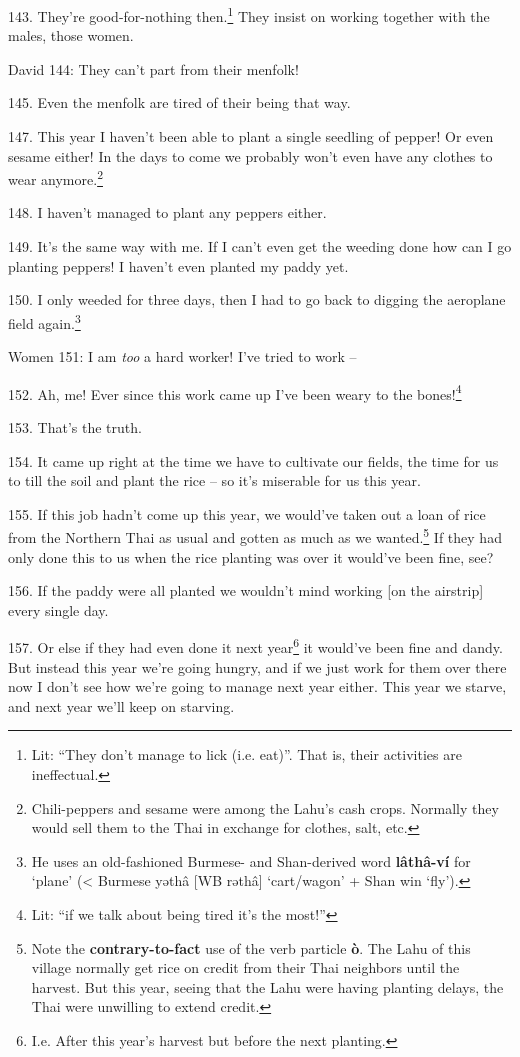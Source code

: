 143. They're good-for-nothing then.\footnote{Lit: ``They don't manage to lick (i.e. eat)''. That is, their activities are ineffectual.} They insist on working together with the
males, those women.

David 144: They can't part from their menfolk!

145. Even the menfolk are tired of their being that way.

147. This year I haven't been able to plant a single seedling of pepper! Or even
sesame either! In the days to come we probably won't even have any clothes to wear
anymore.\footnote{Chili-peppers and sesame were among the Lahu's cash crops. Normally they would sell them to the Thai in exchange for clothes, salt, etc.}

148. I haven't managed to plant any peppers either.

149. It's the same way with me. If I can't even get the weeding done how can I
go planting peppers! I haven't even planted my paddy yet.

150. I only weeded for three days, then I had to go back to digging the aeroplane
field again.\footnote{He uses an old-fashioned Burmese- and Shan-derived word \textbf{lâthâ-ví} for `plane' (< Burmese yəthâ [WB rəthâ] `cart/wagon' + Shan win `fly').}

Women 151: I am \textit{too} a hard worker! I've tried to work --

152. Ah, me! Ever since this work came up I've been weary to the bones!\footnote{Lit: ``if we talk about being tired it's the most!''}

153. That's the truth.

154. It came up right at the time we have to cultivate our fields, the time for
us to till the soil and plant the rice -- so it's miserable for us this year.

155. If this job hadn't come up this year, we would've taken out a loan of rice
from the Northern Thai as usual and gotten as much as we wanted.\footnote{Note the \textbf{contrary-to-fact} use of the verb particle \textbf{ò}. The Lahu of this village normally get rice on credit from their Thai neighbors until the harvest. But this year, seeing that the Lahu were having planting delays, the Thai were unwilling to extend credit.} If they had
only done this to us when the rice planting was over it would've been fine, see?

156. If the paddy were all planted we wouldn't mind working [on the airstrip] every
single day.

157. Or else if they had even done it next year\footnote{I.e. After this year's harvest but before the next planting.} it would've been fine and dandy.
But instead this year we're going hungry, and if we just work for them over there
now I don't see how we're going to manage next year either. This year we starve,
and next year we'll keep on starving.

